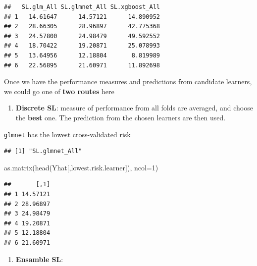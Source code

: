 \documentclass[
]{book}
\newenvironment{Shaded}{\begin{snugshade}}{\end{snugshade}}
\newcommand{\AttributeTok}[1]{\textcolor[rgb]{0.77,0.63,0.00}{#1}}
\newcommand{\DecValTok}[1]{\textcolor[rgb]{0.00,0.00,0.81}{#1}}
\newcommand{\FunctionTok}[1]{\textcolor[rgb]{0.00,0.00,0.00}{#1}}
\newcommand{\NormalTok}[1]{#1}
\newcommand{\OtherTok}[1]{\textcolor[rgb]{0.56,0.35,0.01}{#1}}
\newcommand{\SpecialCharTok}[1]{\textcolor[rgb]{0.00,0.00,0.00}{#1}}
\providecommand{\tightlist}{%
  \setlength{\itemsep}{0pt}\setlength{\parskip}{0pt}}
\begin{document}
\begin{verbatim}
##   SL.glm_All SL.glmnet_All SL.xgboost_All
## 1   14.61647      14.57121      14.890952
## 2   28.66305      28.96897      42.775368
## 3   24.57800      24.98479      49.592552
## 4   18.70422      19.20871      25.078993
## 5   13.64956      12.18804       8.819989
## 6   22.56895      21.60971      11.892698
\end{verbatim}

Once we have the performance measures and predictions from candidate learners, we could go one of \textbf{two routes} here

\begin{enumerate}
\def\labelenumi{\alph{enumi}.}
\tightlist
\item
  \textbf{Discrete SL}: measure of performance from all folds are averaged, and choose the \textbf{best} one. The prediction from the chosen learners are then used.
\end{enumerate}

\texttt{glmnet} has the lowest cross-validated risk

\begin{Shaded}
\end{Shaded}

\begin{verbatim}
## [1] "SL.glmnet_All"
\end{verbatim}

\begin{Shaded}
\begin{Highlighting}[]
\FunctionTok{as.matrix}\NormalTok{(}\FunctionTok{head}\NormalTok{(Yhat[,lowest.risk.learner]), }
          \AttributeTok{ncol=}\DecValTok{1}\NormalTok{)}
\end{Highlighting}
\end{Shaded}

\begin{verbatim}
##       [,1]
## 1 14.57121
## 2 28.96897
## 3 24.98479
## 4 19.20871
## 5 12.18804
## 6 21.60971
\end{verbatim}

\begin{enumerate}
\def\labelenumi{\alph{enumi}.}
\setcounter{enumi}{1}
\tightlist
\item
  \textbf{Ensamble SL}:
\end{enumerate}
\end{document}
